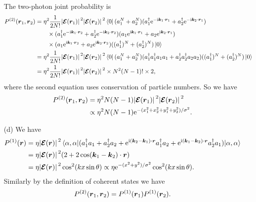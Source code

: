 \documentclass[hyperref, a4paper]{article}
\newcommand*{\ii}{\mathrm{i}}
\newcommand*{\ee}{\mathrm{e}}
\begin{document}
\begin{itemize}
The two-photon joint probability is 
\[
    \begin{aligned}
        P^{(2)}(\vb*{r}_1, \vb*{r}_2) &= \eta^2 \frac{1}{2 N!} \abs*{\vb*{\mathcal{E}}(\vb*{r}_1)}^2 \abs*{\vb*{\mathcal{E}}(\vb*{r}_2)}^2 \bra*{0} (a_1^N + a_2^N) 
        (a_1^\dagger \ee^{- \ii \vb*{k}_1 \cdot \vb*{r}_1} + a_2^\dagger \ee^{- \ii \vb*{k}_2 \cdot \vb*{r}_1}) \\
        &\quad \quad \times (a_1^\dagger \ee^{- \ii \vb*{k}_1 \cdot \vb*{r}_2} + a_2^\dagger \ee^{- \ii \vb*{k}_2 \cdot \vb*{r}_2})  (a_1 \ee^{\ii \vb*{k}_1 \cdot \vb*{r}_1} + a_2 \ee^{\ii \vb*{k}_2 \cdot \vb*{r}_1}) \\ 
        &\quad \quad \times (a_1 \ee^{\ii \vb*{k}_1 \cdot \vb*{r}_2} + a_2 \ee^{ \ii \vb*{k}_2 \cdot \vb*{r}_2}) ((a_1^\dagger)^N +  (a_2^\dagger)^N) \ket*{0} \\
        &= \eta^2 \frac{1}{2 N!} \abs*{\vb*{\mathcal{E}}(\vb*{r}_1)}^2 \abs*{\vb*{\mathcal{E}}(\vb*{r}_2)}^2 \bra*{0} (a_1^N + a_2^N) (a_1^\dagger a_1^\dagger a_1 a_1 + a_2^\dagger a_2^\dagger a_2 a_2) ((a_1^\dagger)^N +  (a_2^\dagger)^N) \ket*{0} \\
        &= \eta^2 \frac{1}{2 N!} \abs*{\vb*{\mathcal{E}}(\vb*{r}_1)}^2 \abs*{\vb*{\mathcal{E}}(\vb*{r}_2)}^2 \times N^2 (N-1)! \times 2,
    \end{aligned}
\]
where the second equation uses conservation of particle numbers.
So we have 
\begin{equation}
    \begin{aligned}
        P^{(2)}(\vb*{r}_1, \vb*{r}_2) &= \eta^2 N (N-1) \abs*{\vb*{\mathcal{E}}(\vb*{r}_1)}^2 \abs*{\vb*{\mathcal{E}}(\vb*{r}_2)}^2 \\
        &\propto \eta^2 N (N-1) \ee^{- (x_1^2 + x_2^2 + y_1^2 + y_2^2) / \sigma^2}.
    \end{aligned}
\end{equation}

\item[(d)] We have 
\begin{equation}
    \begin{aligned}
        P^{(1)}(\vb*{r}) &= \eta \abs*{\vb*{\mathcal{E}}(\vb*{r})}^2 \expval*{(a_1^\dagger a_1 + a_2^\dagger a_2 + \ee^{\ii (\vb*{k}_2 - \vb*{k}_1) \cdot \vb*{r}} a_1^\dagger a_2 + \ee^{\ii (\vb*{k}_1 - \vb*{k}_2) \cdot \vb*{r}} a_2^\dagger a_1 )}{\alpha, \alpha} \\
        &= \eta \abs*{\vb*{\mathcal{E}}(\vb*{r})}^2 (2 + 2 \cos (\vb*{k}_1 - \vb*{k}_2) \cdot \vb*{r}) \\
        &=  \eta \abs*{\vb*{\mathcal{E}}(\vb*{r})}^2 \cos^2 (k x \sin \theta)
        \propto \eta \ee^{- (x^2 + y^2) / \sigma^2} \cos^2 (k x \sin \theta).
    \end{aligned}
\end{equation}
Similarly by the definition of coherent states we have 
\begin{equation}
    P^{(2)}(\vb*{r}_1, \vb*{r}_2) = P^{(1)}(\vb*{r}_1) P^{(1)}(\vb*{r}_2).
    \label{eq:coherent-second-order}
\end{equation}


\end{itemize}
\end{document}
